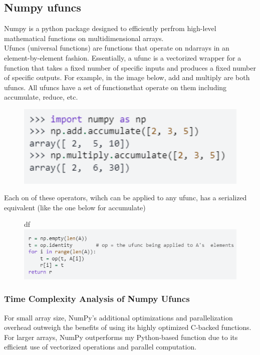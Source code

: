 \documentclass[12pt]{article}
\begin{document}
\subsection{Numpy ufuncs}

Numpy is a python package designed to efficiently perfrom high-level mathematical functions on multidimensional arrays. \\


Ufuncs (universal functions) are functions that operate on ndarrays in an element-by-element fashion. Essentially, a ufunc is a vectorized wrapper for a function that takes a fixed number of specific inputs and produces a fixed number of specific outputs. For example, in the image below, add and multiply are both ufuncs. All ufuncs have a set of functionsthat operate on them including accumulate, reduce, etc. 
\begin{figure}[H]
    \centering
    \includegraphics[width=1.0\textwidth]{./ufunc.png} %
\end{figure}
Each on of these operators, wihch can be applied to any ufunc, has a serialized equivalent (like the one below for accumulate)

\begin{figure}[H]df
    \centering
    \includegraphics[width=1.0\textwidth]{./ufunc_eq.png} %
\end{figure}
\subsubsection{Time Complexity Analysis of Numpy Ufuncs}
For small array size, NumPy's additional optimizations and parallelization overhead outweigh the benefits of using its highly optimized C-backed functions. For larger arrays, NumPy outperforms my Python-based function due to its efficient use of vectorized operations and parallel computation.
\end{document}
